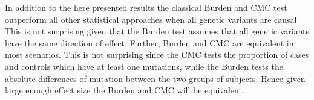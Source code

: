 In addition to the here presented results the classical Burden and CMC test outperform all other statistical approaches when all genetic variants are causal.
This is not surprising given that the Burden test assumes that all genetic variants have the same direction of effect.
Further, Burden and CMC are equivalent in most scenarios.
This is not surprising since the CMC tests the proportion of cases and controls which have at least one mutations, while the Burden tests the absolute differences of mutation between the two groups of subjects.
Hence given large enough effect size the Burden and CMC will be equivalent.

